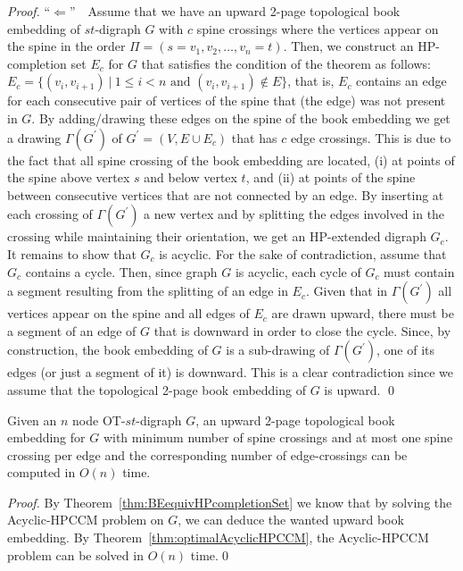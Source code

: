 \documentclass{myllncs-mixalis}
\begin{document}
\begin{proof}
``$\Leftarrow$''$~~~$ Assume that we have an upward 2-page
topological book embedding of $st$-digraph $G$ with $c$ spine
crossings where the vertices appear on the spine in the order
$\Pi=(s=v_1, v_2, \ldots, v_n=t)$. Then, we construct an
HP-completion set $E_c$ for $G$ that satisfies the condition of the
theorem as follows: $E_c = \{ (v_i, v_{i+1}) ~|~ 1 \leq i <n
\mbox{~and~} (v_i, v_{i+1}) \not\in E \}$, that is, $E_c$ contains
an edge for each consecutive pair of vertices of the spine that (the
edge) was not present in $G$. By adding/drawing these edges on the
spine of the book embedding we get a drawing  $\Gamma(G^\prime)$ of
$G^\prime=(V,E \cup E_c)$ that has $c$ edge crossings. This is due
to the fact that all spine crossing of the book embedding are
located, (i) at points of the spine above vertex $s$ and below
vertex $t$, and (ii) at points of the spine between consecutive
vertices that are not connected by an edge. By inserting at  each
crossing of $\Gamma(G^\prime)$  a new vertex and by splitting the
edges involved in the crossing while maintaining their orientation,
we get an HP-extended digraph $G_c$. It remains to show that $G_c$
is acyclic. For the sake of contradiction, assume that $G_c$
contains a cycle. Then, since graph $G$ is acyclic, each cycle of
$G_c$ must contain a segment resulting from the splitting of an edge
in $E_c$. Given that in $\Gamma(G^\prime)$ all vertices appear on
the spine and all edges of $E_c$ are drawn upward, there must be a
segment of an edge of $G$ that is downward in order to close the
cycle. Since, by construction, the book embedding of $G$ is a
sub-drawing of $\Gamma(G^\prime)$,  one of its edges (or just a
segment of it) is downward. This is a clear contradiction since we
assume that the topological 2-page book embedding of $G$ is upward.
\qed
\end{proof}


\begin{theorem}
\label{thm:optimalAcyclicHPCCM} Given an  $n$ node OT-$st$-digraph
$G$, an upward 2-page topological book embedding for $G$ with
minimum number of spine crossings and at most one spine crossing per
edge and the corresponding number of edge-crossings can be computed
in $O(n)$ time.
\end{theorem}

\begin{proof}
By Theorem~\ref{thm:BEequivHPcompletionSet} we know that by solving
the Acyclic-HPCCM problem on $G$, we can deduce the wanted upward
book embedding. By Theorem~\ref{thm:optimalAcyclicHPCCM}, the
Acyclic-HPCCM problem can be solved in $O(n)$ time.\qed
\end{proof}
\end{document}
